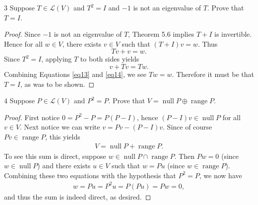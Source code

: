 \documentclass{extarticle}
\newenvironment{problem}[1]{\begin{prob*}{#1}{}}{\end{prob*}}
\newcommand{\Hom}{\mathcal{L}}
\DeclareMathOperator{\Null}{null}
\DeclareMathOperator{\Range}{range}
\begin{document}
\begin{problem}{3}
Suppose $T\in\Hom(V)$ and $T^2 = I$ and $-1$ is not an eigenvalue of $T$.  Prove that $T = I$.  
\end{problem}
\begin{proof}
Since $-1$ is not an eigenvalue of $T$, Theorem 5.6 implies $T + I$ is invertible.  Hence for all $w\in V$, there exists $v\in V$ such that $(T+I)v = w$.  Thus 
\begin{equation}
Tv + v = w. \label{eq13}
\end{equation}
Since $T^2 = I$, applying $T$ to both sides yields
\begin{equation}
v + Tv = Tw. \label{eq14}
\end{equation}  
Combining Equations \ref{eq13} and \ref{eq14}, we see $Tw = w$.  Therefore it must be that $T= I$, as was to be shown.
\end{proof}

\begin{problem}{4}
Suppose $P\in\Hom(V)$ and $P^2 = P$.  Prove that $V= \Null P \oplus \Range P$.  
\end{problem}
\begin{proof}
First notice $0 = P^2 - P = P(P - I)$, hence $(P - I)v \in \Null P$ for all $v\in V$.  Next notice we can write $v = Pv - (P - I)v$.  Since of course $Pv\in \Range P$, this yields
\begin{align*}
V = \Null P + \Range P.
\end{align*}
To see this sum is direct, suppose $w \in \Null P \cap \Range P$.  Then $Pw = 0$ (since $w\in \Null P$) and there exists $u\in V$ such that $w = Pu$ (since $w \in \Range P$).  Combining these two equations with the hypothesis that $P^2 = P$, we now have
\begin{align*}
w = Pu = P^2 u = P(Pu) = Pw = 0,
\end{align*}
and thus the sum is indeed direct, as desired.
\end{proof}
\end{document}
